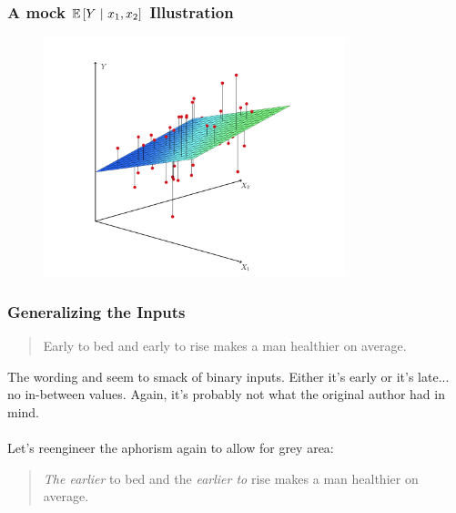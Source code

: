 \documentclass[slides]{beamer} %
\begin{document}
\begin{frame}\frametitle{A mock $\mathbb{E}\left[Y~|~x_1, x_2\right]$ Illustration}

\begin{figure}
\centering
\includegraphics[width=3.45in]{cef.png}
\end{figure}
	
\end{frame}

\begin{frame}\frametitle{Generalizing the Inputs}

\begin{quotation}
Early to bed and early to rise makes a man healthier on average.
\end{quotation}

The wording  and  seem to smack of  \pause binary inputs. Either it's early or it's late... no in-between values.  \pause Again, it's probably not what the original author had in mind.\\~\\ %

Let's reengineer the aphorism again to allow for grey area: \pause 

\begin{quotation}
\emph{The earlier} to bed and the \emph{earlier to} rise makes a man healthier on average.
\end{quotation}

\end{frame}
\end{document}
